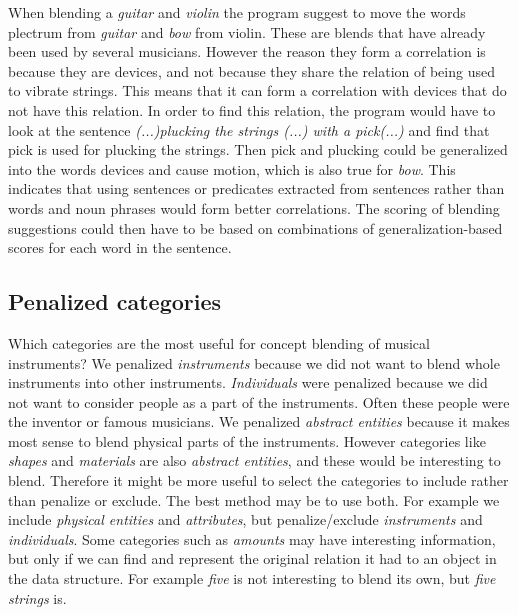 

When blending a \emph{guitar} and \emph{violin} the program suggest to move the words plectrum from \emph{guitar} and \emph{bow} from violin. These are blends that have already been used by several musicians. However the reason they form a correlation is because they are devices, and not because they share the relation of being used to vibrate strings. This means that it can form a correlation with devices that do not have this relation. In order to find this relation, the program would have to look at the sentence \emph{(...)plucking the strings (...) with a pick(...)} and find that pick is used for plucking the strings. Then pick and plucking could be generalized into the words devices and cause motion, which is also true for \emph{bow}. This indicates that using sentences or predicates extracted from sentences rather than words and noun phrases would form better correlations. The scoring of blending suggestions could then have to be based on combinations of generalization-based scores for each word in the sentence.


\subsection{Penalized categories}
Which categories are the most useful for concept blending of musical instruments? We penalized \emph{instruments} because we did not want to blend whole instruments into other instruments. \emph{Individuals} were penalized because we did not want to consider people as a part of the instruments. Often these people were the inventor or famous musicians. We penalized \emph{abstract entities} because it makes most sense to blend physical parts of the instruments. However categories like \emph{shapes} and \emph{materials} are also \emph{abstract entities}, and these would be interesting to blend. Therefore it might be more useful to select the categories to include rather than penalize or exclude. The best method may be to use both. For example we include \emph{physical entities} and \emph{attributes}, but penalize/exclude \emph{instruments} and \emph{individuals}. Some categories such as \emph{amounts} may have interesting information, but only if we can find and represent the original relation it had to an object in the data structure. For example \emph{five} is not interesting to blend its own, but \emph{five strings} is.

